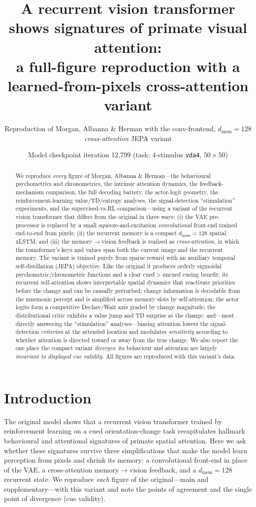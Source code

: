 \documentclass[11pt]{article}
\title{\textbf{A recurrent vision transformer shows signatures of primate visual attention:\\
a full-figure reproduction with a learned-from-pixels cross-attention variant}}
\author{Reproduction of Morgan, Albanna \& Herman with the conv-frontend, $d_{\mathrm{mem}}{=}128$ \emph{cross-attention} JEPA variant}
\date{Model checkpoint iteration 12{,}799 (task: 4-stimulus \texttt{vda4}, $50\times50$)}
\begin{document}
\maketitle
\begin{abstract}\noindent
We reproduce \emph{every} figure of Morgan, Albanna \& Herman---the behavioural psychometrics and
chronometrics, the intrinsic attention dynamics, the feedback-mechanism comparison, the full decoding
battery, the actor-logit geometry, the reinforcement-learning value/TD/entropy analyses, the
signal-detection ``stimulation'' experiments, and the supervised-vs-RL comparison---using a variant of
the recurrent vision transformer that differs from the original in three ways: (i) the VAE
pre-processor is replaced by a small squeeze-and-excitation \emph{convolutional} front-end trained
end-to-end from pixels; (ii) the recurrent memory is a compact $d_{\mathrm{mem}}{=}128$ spatial xLSTM;
and (iii) the memory$\to$vision feedback is realised as \emph{cross-attention}, in which the
transformer's keys and values span both the current image and the recurrent memory. The variant is
trained purely from sparse reward with an auxiliary temporal self-distillation (JEPA) objective. Like
the original it produces orderly sigmoidal psychometric/chronometric functions and a clear cued$>$uncued
cueing benefit; its recurrent self-attention shows interpretable spatial dynamics that reactivate
priorities before the change and can be causally perturbed; change information is decodable from the
mnemonic percept and is amplified across memory slots by self-attention; the actor logits form a
competitive Declare/Wait axis graded by change magnitude; the distributional critic exhibits a value
jump and TD surprise at the change; and---most directly answering the ``stimulation'' analyses---biasing
attention lowers the signal-detection \emph{criterion} at the attended location and modulates
\emph{sensitivity} according to whether attention is directed toward or away from the true change. We
also report the one place the compact variant \emph{diverges}: its behaviour and attention are largely
\emph{invariant to displayed cue validity}. All figures are reproduced with this variant's data.
\end{abstract}

\section{Introduction}
The original model shows that a recurrent vision transformer trained by reinforcement learning on a
cued orientation-change task recapitulates hallmark behavioural and attentional signatures of primate
spatial attention. Here we ask whether these signatures survive three simplifications that make the
model learn perception from pixels and shrink its memory: a convolutional front-end in place of the
VAE, a cross-attention memory$\to$vision feedback, and a $d_{\mathrm{mem}}{=}128$ recurrent state. We
reproduce \emph{each} figure of the original---main and supplementary---with this variant and note the
points of agreement and the single point of divergence (cue validity).
\end{document}
